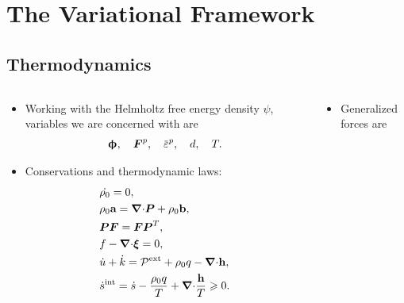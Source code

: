 \section{The Variational Framework}

\sectioncover

\subsection{Thermodynamics}

\begin{frame}
  \vspace{-2em}
  \begin{columns}
    \begin{column}{0.4\textwidth}
      \begin{itemize}
        \item  Working with the Helmholtz free energy density $\psi$, variables we are concerned with are
              \begin{align*}
                \bs{\upphi}, \quad \defgrad^p, \quad \ep, \quad d, \quad T.
              \end{align*}
        \item Conservations and thermodynamic laws:
              \begin{align*}
                 & \dot{\rho_0} = 0,                                                                             \\
                 & \rho_0 \textbf{a} = {\boldsymbol{\nabla} \cdot} \boldsymbol{P} + \rho_0\textbf{b},                                                  \\
                 & \boldsymbol{P}\boldsymbol{F} = \boldsymbol{F}\boldsymbol{P}^T,                                                                \\
                 & f -{\boldsymbol{\nabla} \cdot} \boldsymbol{\xi} = 0,                                                                  \\
                 & \dot{u} + \dot{k} = \mathcal{P}^\text{ext} + \rho_0 q - {\boldsymbol{\nabla} \cdot} \textbf{h},                     \\
                 & \dot{s}^\text{int} = \dot{s} - \dfrac{\rho_0 q}{T} + {\boldsymbol{\nabla} \cdot} \dfrac{\textbf{h}}{T} \geqslant 0. 
              \end{align*}
      \end{itemize}
    \end{column}
    \pause
    \begin{column}{0.6\textwidth}
      \begin{itemize}
        \item Generalized forces are

\end{itemize}
\end{column}
\end{columns}
\end{frame}
